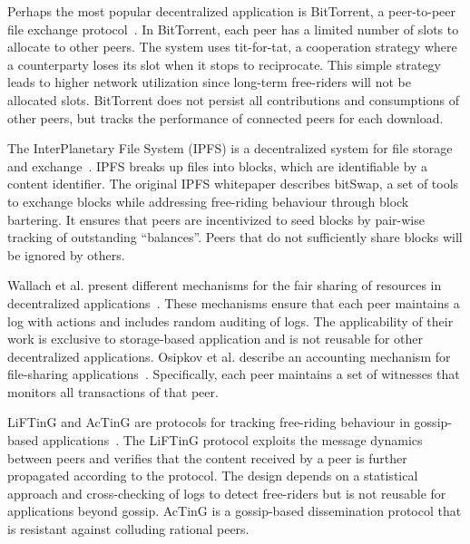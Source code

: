 Perhaps the most popular decentralized application is BitTorrent, a peer-to-peer file exchange protocol~\cite{cohen2003incentives}.
In BitTorrent, each peer has a limited number of slots to allocate to other peers.
The system uses tit-for-tat, a cooperation strategy where a counterparty loses its slot when it stops to reciprocate.
This simple strategy leads to higher network utilization since long-term free-riders will not be allocated slots.
BitTorrent does not persist all contributions and consumptions of other peers, but tracks the performance of connected peers for each download.

The InterPlanetary File System (IPFS) is a decentralized system for file storage and exchange~\cite{benet2014ipfs}.
IPFS breaks up files into blocks, which are identifiable by a content identifier.
The original IPFS whitepaper describes bitSwap, a set of tools to exchange blocks while addressing free-riding behaviour through block bartering.
It ensures that peers are incentivized to seed blocks by pair-wise tracking of outstanding \enquote{balances}.
Peers that do not sufficiently share blocks will be ignored by others.

Wallach et al. present different mechanisms for the fair sharing of resources in decentralized applications~\cite{wallach2003enforcing}.
These mechanisms ensure that each peer maintains a log with actions and includes random auditing of logs.
The applicability of their work is exclusive to storage-based application and is not reusable for other decentralized applications.
Osipkov et al. describe an accounting mechanism for file-sharing applications~\cite{osipkov2006robust}.
Specifically, each peer maintains a set of witnesses that monitors all transactions of that peer.

LiFTinG and AcTinG are protocols for tracking free-riding behaviour in gossip-based applications~\cite{guerraoui2010lifting,mokhtar2014acting}.
The LiFTinG protocol exploits the message dynamics between peers and verifies that the content received by a peer is further propagated according to the protocol.
The design depends on a statistical approach and cross-checking of logs to detect free-riders but is not reusable for applications beyond gossip.
AcTinG is a gossip-based dissemination protocol that is resistant against colluding rational peers.

